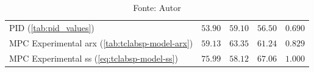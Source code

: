 \begin{table}[!h]
\begin{tabular}{l|cc|c|c}
		PID (\cref{tab:pid_values})	                                        &   $53.90$           												&   $59.10$          														&   $56.50$														&   $0.690$             											\\ 
		MPC Experimental \acrshort{arx}	(\cref{tab:tclabsp-model-arx})		&   $59.13$           												&   $63.35$          														&   $61.24$														&   $0.829$             											\\ 
		MPC Experimental \acrshort{ss} (\cref{eq:tclabsp-model-ss})			&   $75.99$           												&   $58.12$          														&   $67.06$														&   $1.000$             											\\ \bottomrule 
	\end{tabular}
	\caption*{Fonte: Autor}
\end{table}   


